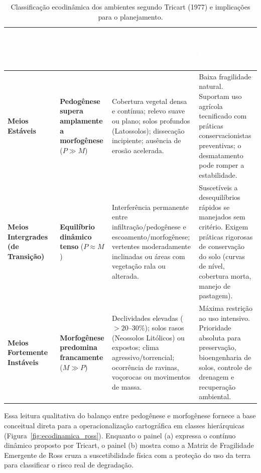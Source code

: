 \begin{table}[H]
\centering
\caption{Classificação ecodinâmica dos ambientes segundo Tricart (1977) e implicações para o planejamento.}
\label{tab:ecodinamica_tricart}
\renewcommand{\arraystretch}{1.20}
\small
\begin{tabularx}{\textwidth}{@{}p{2.6cm} p{2.9cm} p{3.0cm} >{\raggedright\arraybackslash}X@{}}
  \toprule
  \rowcolor{uefsNavy}
  \textcolor{white}{\bfseries Meio Ecodinâmico} & \textcolor{white}{\bfseries Balanço Morfogênese vs. Pedogênese} & \textcolor{white}{\bfseries Características Típicas} & \textcolor{white}{\bfseries Manejo e Fragilidade} \\
  \midrule
  \textbf{Meios Estáveis} & \textbf{Pedogênese supera amplamente a morfogênese} ($P \gg M$) & Cobertura vegetal densa e contínua; relevo suave ou plano; solos profundos (Latossolos); dissecação incipiente; ausência de erosão acelerada. & Baixa fragilidade natural. Suportam uso agrícola tecnificado com práticas conservacionistas preventivas; o desmatamento pode romper a estabilidade. \\
  \rowcolor{bgGray}
  \textbf{Meios Intergrades (de Transição)} & \textbf{Equilíbrio dinâmico tenso} ($P \approx M$) & Interferência permanente entre infiltração/pedogênese e escoamento/morfogênese; vertentes moderadamente inclinadas ou áreas com vegetação rala ou alterada. & Suscetíveis a desequilíbrios rápidos se manejados sem critério. Exigem práticas rigorosas de conservação do solo (curvas de nível, cobertura morta, manejo de pastagem). \\
  \textbf{Meios Fortemente Instáveis} & \textbf{Morfogênese predomina francamente} ($M \gg P$) & Declividades elevadas ($>20\text{--}30\%$); solos rasos (Neossolos Litólicos) ou expostos; clima agressivo/torrencial; ocorrência de ravinas, voçorocas ou movimentos de massa. & Máxima restrição ao uso intensivo. Prioridade absoluta para preservação, bioengenharia de solos, controle de drenagem e recuperação ambiental. \\
  \bottomrule
\end{tabularx}
\end{table}

Essa leitura qualitativa do balanço entre pedogênese e morfogênese fornece a base conceitual direta para a operacionalização cartográfica em classes hierárquicas (Figura~\ref{fig:ecodinamica_ross}). Enquanto o painel (a) expressa o contínuo dinâmico proposto por Tricart, o painel (b) mostra como a Matriz de Fragilidade Emergente de Ross cruza a suscetibilidade física com a proteção do uso da terra para classificar o risco real de degradação.


